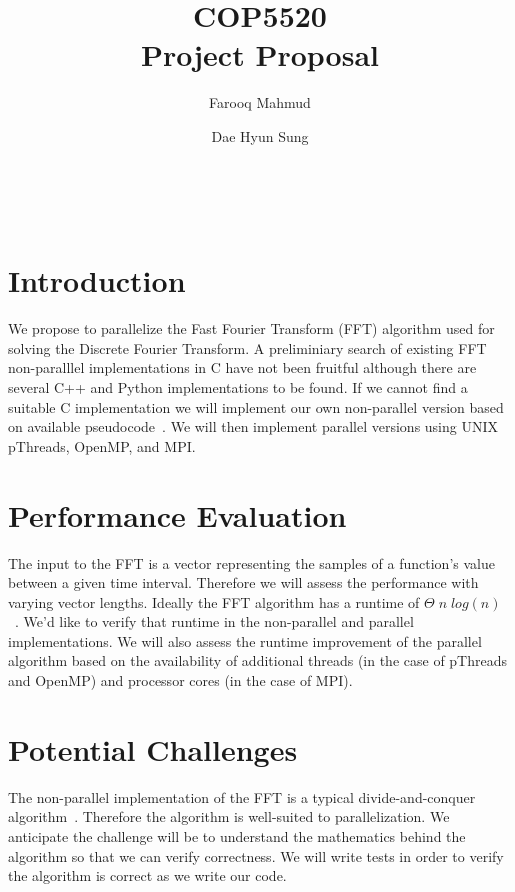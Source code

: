 \documentclass{amsart}
\begin{document}
\title{COP5520\\{\bf Project Proposal}}%
\author{Farooq Mahmud}%
\author{Dae Hyun Sung}%
\date{}


\maketitle\
\thispagestyle{empty}
\section{Introduction}
We propose to parallelize the Fast Fourier Transform (FFT) algorithm used for solving the Discrete Fourier Transform. A preliminiary search of existing FFT non-paralllel implementations in C have not been fruitful although there are several C++ and Python implementations to be found. If we cannot find a suitable C implementation we will implement our own non-parallel version based on available pseudocode~\cite{cormen}. We will then implement parallel versions using UNIX pThreads, OpenMP, and MPI.  

\section{Performance Evaluation}
The input to the FFT is a vector representing the samples of a function's value between a given time interval. Therefore we will assess the performance with varying vector lengths. Ideally the FFT algorithm has a runtime of $\Theta \;n\;log(n)$ ~\cite{cormen}. We'd like to verify that runtime in the non-parallel and parallel implementations. We will also assess the runtime improvement of the parallel algorithm based on the availability of additional threads (in the case of pThreads and OpenMP) and processor cores (in the case of MPI).

\section{Potential Challenges}
The non-parallel implementation of the FFT is a typical divide-and-conquer algorithm~\cite{blelloch}. Therefore the algorithm is well-suited to parallelization. We anticipate the challenge will be to understand the mathematics behind the algorithm so that we can verify correctness. We will write tests in order to verify the algorithm is correct as we write our code. 



\end{document}
